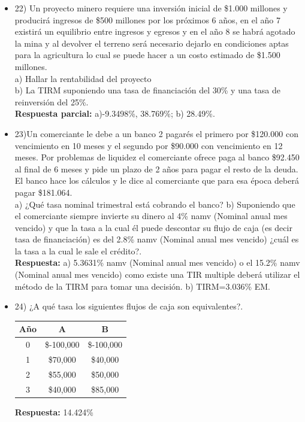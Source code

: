 \begin{itemize}
	\item 22)	Un proyecto minero requiere una inversión inicial de \$1.000 millones y producirá ingresos de \$500 millones por los próximos 6 años, en el año 7 existirá un equilibrio entre ingresos y egresos y en el año 8 se habrá agotado la mina y al devolver el terreno será necesario dejarlo en condiciones aptas para la agricultura lo cual se puede hacer a un costo estimado de \$1.500 millones.\\
	      a) Hallar la rentabilidad del proyecto\\
	      b) La TIRM suponiendo una tasa de financiación del 30\% y una tasa de reinversión del 25\%.\\
	      \textbf{Respuesta parcial:} a)-9.3498\%, 38.769\%; b) 28.49\%.
	      \medskip
	      
	\item 23)Un comerciante le debe a un banco 2 pagarés el primero por \$120.000 con vencimiento en 10 meses y el segundo por \$90.000 con vencimiento en 12 meses. Por problemas de liquidez el comerciante ofrece paga al banco \$92.450 al final de 6 meses y pide un
	      plazo de 2 años para pagar el resto de la deuda. El banco hace los cálculos y le dice al comerciante que para esa época deberá pagar \$181.064.\\
	      a) ¿Qué tasa nominal trimestral está cobrando el banco?
	      b) Suponiendo que el comerciante siempre invierte su dinero al 4\% namv (Nominal anual mes vencido) y que la tasa a la cual él puede descontar su flujo de caja (es decir tasa de financiación) es del 2.8\% namv (Nominal anual mes vencido) ¿cuál es la tasa a la cual le sale el crédito?.\\
	      \textbf{Respuesta:} a) 5.3631\% namv (Nominal anual mes vencido) o el 15.2\% namv (Nominal anual mes vencido) como existe una TIR multiple deberá utilizar el método de la TIRM para tomar una decisión. b) TIRM=3.036\% EM.
	      \medskip
	      
\item 24) ¿A qué tasa los siguientes flujos de caja son equivalentes?.\\
    \begin{center}
        \begin{tabular}{|c|c|c|}
            \hline
            \textbf{Año} & \textbf{A} & \textbf{B} \\ \hline
            0 & \$-100,000 & \$-100,000 \\ \hline
            1 & \$70,000 & \$40,000 \\ \hline
            2 & \$55,000 & \$50,000 \\ \hline
            3 & \$40,000 & \$85,000 \\ \hline
        \end{tabular}
    \end{center}
    \textbf{Respuesta:} 14.424\%
	      \medskip
	      

\end{itemize}
